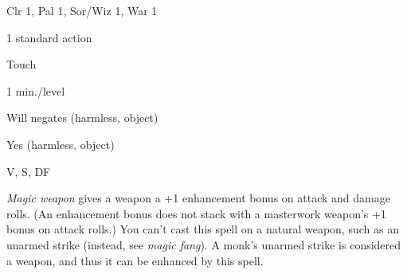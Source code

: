 
\begin{description*}
\item[Level:] Clr 1, Pal 1, Sor/Wiz 1, War 1
\item[Casting Time:] 1 standard action
\item[Range:] Touch
\item[Duration:] 1 min./level
\item[Saving Throw:] Will negates (harmless, object)
\item[Spell Resistance:] Yes (harmless, object)
\item[Components:] V, S, DF
\end{description*}

\textit{Magic weapon} gives a weapon a +1 enhancement bonus on attack and damage
rolls. (An enhancement bonus does not stack with a masterwork weapon's +1 bonus
on attack rolls.)
You can't cast this spell on a natural weapon, such as an unarmed strike (instead,
see \textit{magic fang}). A monk's unarmed strike is considered a weapon, and thus
it can be enhanced by this spell.